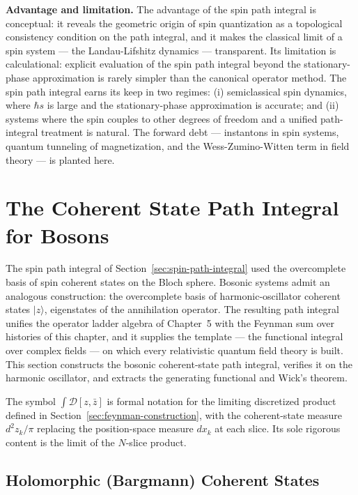 \medskip\noindent\textbf{Advantage and limitation.} The advantage of the spin path integral is conceptual: it reveals the geometric origin of spin quantization as a topological consistency condition on the path integral, and it makes the classical limit of a spin system --- the Landau-Lifshitz dynamics --- transparent. Its limitation is calculational: explicit evaluation of the spin path integral beyond the stationary-phase approximation is rarely simpler than the canonical operator method. The spin path integral earns its keep in two regimes: (i) semiclassical spin dynamics, where $\hbar s$ is large and the stationary-phase approximation is accurate; and (ii) systems where the spin couples to other degrees of freedom and a unified path-integral treatment is natural. The forward debt --- instantons in spin systems, quantum tunneling of magnetization, and the Wess-Zumino-Witten term in field theory --- is planted here.


\section{The Coherent State Path Integral for Bosons}
\label{sec:coherent-state-path-integral}

The spin path integral of Section~\ref{sec:spin-path-integral} used the overcomplete basis of spin coherent states on the Bloch sphere. Bosonic systems admit an analogous construction: the overcomplete basis of harmonic-oscillator coherent states $|z\rangle$, eigenstates of the annihilation operator. The resulting path integral unifies the operator ladder algebra of Chapter~5 with the Feynman sum over histories of this chapter, and it supplies the template --- the functional integral over complex fields --- on which every relativistic quantum field theory is built. This section constructs the bosonic coherent-state path integral, verifies it on the harmonic oscillator, and extracts the generating functional and Wick's theorem.

\begin{note}
The symbol $\int\mathcal{D}[z,\bar z]$ is formal notation for the limiting discretized product defined in Section~\ref{sec:feynman-construction}, with the coherent-state measure $d^{2}z_{k}/\pi$ replacing the position-space measure $dx_{k}$ at each slice. Its sole rigorous content is the limit of the $N$-slice product.
\end{note}

\subsection{Holomorphic (Bargmann) Coherent States}

